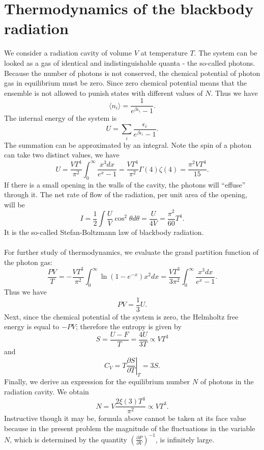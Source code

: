 \section{Thermodynamics of the blackbody radiation}
We consider a radiation cavity of volume $V$ at temperature $T$. The system can be looked as a gas of identical and indistinguishable quanta - the so-called photons. 
Because the number of photons is not conserved, the chemical potential of photon gas in equilibrium must be zero. Since zero chemical potential means that the ensemble is not allowed to punish states with different values of $N$. 
Thus we have
\[\langle n_i \rangle = \frac{1}{e^{\beta \epsilon_i} - 1}.\]
The internal energy of the system is
\[ U = \sum_i \frac{\epsilon_i}{e^{\beta \epsilon_i} - 1}.\]
The summation can be approximated by an integral. Note the spin of a photon can take two distinct values, we have
\[U = \frac{VT^4}{\pi^2} \int_0^{\infty} \frac{x^3dx}{e^x - 1} = \frac{VT^4}{\pi^2} \Gamma(4)\zeta(4) = \frac{\pi^2VT^4}{15}.\]
If there is a small opening in the walls of the cavity, the photons will ``effuse'' through it. The net rate of flow of the radiation, per unit area of the opening, will be
\[I = \frac{1}{2} \int \frac{U}{V} \cos^2\theta d\theta = \frac{U}{4V} = \frac{\pi^2}{60}T^4.\]
It is the so-called Stefan-Boltzmann law of blackbody radiation.
\\ \\
For further study of thermodynamics, we evaluate the grand partition function of the photon gas:
\[\frac{PV}{T} = -\frac{VT^3}{\pi^2} \int_0^{\infty} \ln(1-e^{-x}) x^2 dx = \frac{VT^3}{3\pi^2} \int_0^{\infty} \frac{x^3dx}{e^x - 1}.\]
Thus we have 
\[PV = \frac{1}{3}U.\]
Next, since the chemical potential of the system is zero, the Helmholtz free energy is equal to $-PV$; therefore the entropy is given by
\[S = \frac{U-F}{T} = \frac{4U}{3T} \propto VT^3\]
and
\[C_V = T \left. \frac{\partial S}{\partial T} \right|_T = 3S.\]
Finally, we derive an expression for the equilibrium number $N$ of photons in the radiation cavity. We obtain
\[N = V\frac{2\xi(3)T^3}{\pi^2} \propto VT^3.\]
Instructive though it may be, formula above cannot be taken at its face value because in the present problem the magnitude of the fluctuations in the variable $N$, which is determined by the quantity $\left(\frac{\partial P}{\partial V} \right)^{-1}$, is infinitely large.